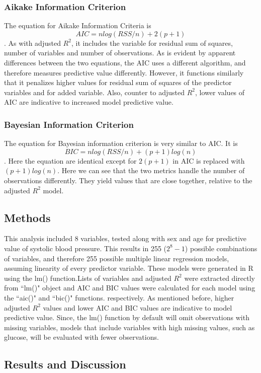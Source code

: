\documentclass{article}\usepackage[]{graphicx}\usepackage[]{color}
\begin{document}
\subsubsection*{Aikake Information Criterion}
 The equation for Aikake Information Criteria is $$ AIC=nlog(RSS/n)+2(p+1)$$.  As with adjusted $R^2$, it includes the variable for residual sum of squares, number of variables and number of observations.  As is evident by apparent differences between the two equations, the AIC uses a different algorithm, and therefore measures predictive value differently.  However, it functions similarly that it penalizes higher values for residual sum of squares of the predictor variables and for added variable.  Also, counter to adjusted $R^2$, lower values of AIC are indicative to increased model predictive value.
 \subsubsection*{Bayesian Information Criterion}
 The equation for Bayesian information criterion is very similar to AIC. It is $$ BIC=nlog(RSS/n)+(p+1)log(n) $$.  Here the equation are identical except for $2(p+1)$ in AIC is replaced with $(p+1)log(n)$.  Here we can see that the two metrics handle the number of observations differently.  They  yield values that are close together, relative to the adjusted $R^2$ model.
 
\subsection{Methods}
This analysis included 8 variables, tested along with sex and age for predictive value of systolic blood pressure.  This results in 255 ($2^8-1$) possible combinations of variables, and therefore 255 possible multiple linear regression models, assuming linearity of every predictor variable.  These models were generated in R using the lm() function.Lists of variables and adjusted $R^2$ were extracted directly from ``lm()" object and AIC and BIC values were calculated for each model using the ``aic()" and ``bic()" functions. respectively. As mentioned before, higher adjusted $R^2$ values and lower AIC and BIC values are indicative to model predictive value. Since, the lm() function by default will omit observations with missing variables, models that include variables with high missing values, such as glucose, will be evaluated with fewer observations.

\subsection{Results and Discussion}
\end{document}
